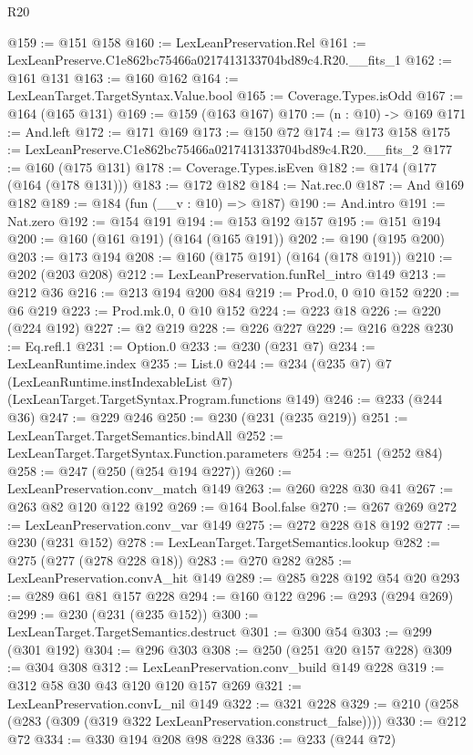 \begin{lexlean}{R20}
\begin{coremodule}
@159 := @151 @158
@160 := LexLeanPreservation.Rel
@161 := LexLeanPreserve.C1e862bc75466a0217413133704bd89c4.R20.__fits_1
@162 := @161 @131
@163 := @160 @162
@164 := LexLeanTarget.TargetSyntax.Value.bool
@165 := Coverage.Types.isOdd
@167 := @164 (@165 @131)
@169 := @159 (@163 @167)
@170 := (n : @10) -> @169
@171 := And.left
@172 := @171 @169
@173 := @150 @72
@174 := @173 @158
@175 := LexLeanPreserve.C1e862bc75466a0217413133704bd89c4.R20.__fits_2
@177 := @160 (@175 @131)
@178 := Coverage.Types.isEven
@182 := @174 (@177 (@164 (@178 @131)))
@183 := @172 @182
@184 := Nat.rec.{0}
@187 := And @169 @182
@189 := @184 (fun (__v : @10) => @187)
@190 := And.intro
@191 := Nat.zero
@192 := @154 @191
@194 := @153 @192 @157
@195 := @151 @194
@200 := @160 (@161 @191) (@164 (@165 @191))
@202 := @190 (@195 @200)
@203 := @173 @194
@208 := @160 (@175 @191) (@164 (@178 @191))
@210 := @202 (@203 @208)
@212 := LexLeanPreservation.funRel_intro @149
@213 := @212 @36
@216 := @213 @194 @200 @84
@219 := Prod.{0, 0} @10 @152
@220 := @6 @219
@223 := Prod.mk.{0, 0} @10 @152
@224 := @223 @18
@226 := @220 (@224 @192)
@227 := @2 @219
@228 := @226 @227
@229 := @216 @228
@230 := Eq.refl.{1}
@231 := Option.{0}
@233 := @230 (@231 @7)
@234 := LexLeanRuntime.index
@235 := List.{0}
@244 := @234
    (@235 @7)
    @7
    (LexLeanRuntime.instIndexableList @7)
    (LexLeanTarget.TargetSyntax.Program.functions @149)
@246 := @233 (@244 @36)
@247 := @229 @246
@250 := @230 (@231 (@235 @219))
@251 := LexLeanTarget.TargetSemantics.bindAll
@252 := LexLeanTarget.TargetSyntax.Function.parameters
@254 := @251 (@252 @84)
@258 := @247 (@250 (@254 @194 @227))
@260 := LexLeanPreservation.conv_match @149
@263 := @260 @228 @30 @41
@267 := @263 @82 @120 @122 @192
@269 := @164 Bool.false
@270 := @267 @269
@272 := LexLeanPreservation.conv_var @149
@275 := @272 @228 @18 @192
@277 := @230 (@231 @152)
@278 := LexLeanTarget.TargetSemantics.lookup
@282 := @275 (@277 (@278 @228 @18))
@283 := @270 @282
@285 := LexLeanPreservation.convA_hit @149
@289 := @285 @228 @192 @54 @20
@293 := @289 @61 @81 @157 @228
@294 := @160 @122
@296 := @293 (@294 @269)
@299 := @230 (@231 (@235 @152))
@300 := LexLeanTarget.TargetSemantics.destruct
@301 := @300 @54
@303 := @299 (@301 @192)
@304 := @296 @303
@308 := @250 (@251 @20 @157 @228)
@309 := @304 @308
@312 := LexLeanPreservation.conv_build @149 @228
@319 := @312 @58 @30 @43 @120 @120 @157 @269
@321 := LexLeanPreservation.convL_nil @149
@322 := @321 @228
@329 := @210 (@258 (@283 (@309 (@319 @322 LexLeanPreservation.construct_false))))
@330 := @212 @72
@334 := @330 @194 @208 @98 @228
@336 := @233 (@244 @72)

\end{coremodule}
\end{lexlean}
